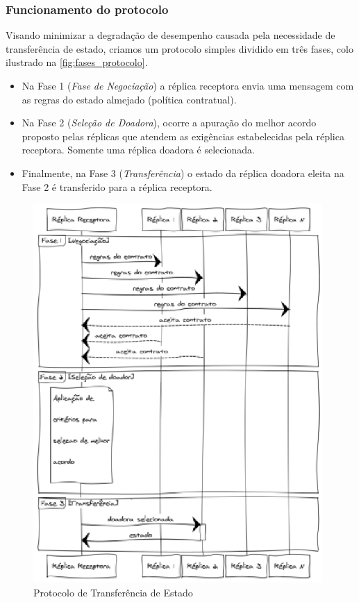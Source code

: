 \subsubsection{Funcionamento do protocolo}

Visando minimizar a degradação de desempenho causada pela necessidade de transferência de
estado, criamos um protocolo simples dividido em três fases, colo ilustrado na
\autoref{fig:fases_protocolo}.

\begin{itemize}
  \item Na Fase 1 (\emph{Fase de Negociação}) a réplica receptora envia uma mensagem com
    as regras do estado almejado (política contratual).
  \item Na Fase 2 (\emph{Seleção de Doadora}), ocorre a apuração do melhor acordo proposto
    pelas réplicas que atendem as exigências estabelecidas pela réplica receptora. Somente
    uma réplica doadora é selecionada.
  \item Finalmente, na Fase 3 (\emph{Transferência}) o estado da réplica doadora eleita na
    Fase 2 é transferido para a réplica receptora.
\end{itemize}

\begin{figure}[ht]
  \centering
  \includegraphics[width=11cm]{conteudo/capitulos/figuras/fases_protocolo.eps}
  \caption{Protocolo de Transferência de Estado}
  \label{fig:fases_protocolo}
\end{figure}

